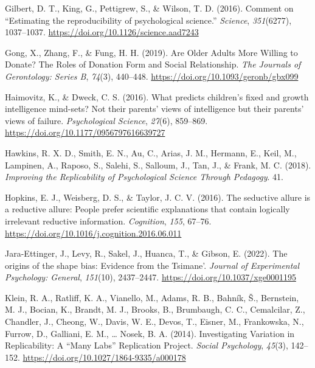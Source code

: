 \documentclass[
  english,
  a4paper,
]{article}
\newlength{\cslhangindent}
\newenvironment{CSLReferences}[2] %
{\begin{list}{}{%
			\setlength{\itemindent}{0pt}
			\setlength{\leftmargin}{0pt}
			\setlength{\parsep}{0pt}
			\ifodd #1
			\setlength{\leftmargin}{\cslhangindent}
			\setlength{\itemindent}{-1\cslhangindent}
			\fi
			\setlength{\itemsep}{#2\baselineskip}}}
	{\end{list}}
\begin{document}
\begin{CSLReferences}{1}{0}
Gilbert, D. T., King, G., Pettigrew, S., \& Wilson, T. D. (2016). Comment on {``{Estimating} the reproducibility of psychological science.''} \emph{Science}, \emph{351}(6277), 1037--1037. \url{https://doi.org/10.1126/science.aad7243}

Gong, X., Zhang, F., \& Fung, H. H. (2019). Are {Older Adults More Willing} to {Donate}? {The Roles} of {Donation Form} and {Social Relationship}. \emph{The Journals of Gerontology: Series B}, \emph{74}(3), 440--448. \url{https://doi.org/10.1093/geronb/gbx099}

Haimovitz, K., \& Dweck, C. S. (2016). What predicts children's fixed and growth intelligence mind-sets? {Not} their parents' views of intelligence but their parents' views of failure. \emph{Psychological Science}, \emph{27}(6), 859--869. \url{https://doi.org/10.1177/0956797616639727}

Hawkins, R. X. D., Smith, E. N., Au, C., Arias, J. M., Hermann, E., Keil, M., Lampinen, A., Raposo, S., Salehi, S., Salloum, J., Tan, J., \& Frank, M. C. (2018). \emph{Improving the {Replicability} of {Psychological Science Through Pedagogy}}. 41.

Hopkins, E. J., Weisberg, D. S., \& Taylor, J. C. V. (2016). The seductive allure is a reductive allure: {People} prefer scientific explanations that contain logically irrelevant reductive information. \emph{Cognition}, \emph{155}, 67--76. \url{https://doi.org/10.1016/j.cognition.2016.06.011}

Jara-Ettinger, J., Levy, R., Sakel, J., Huanca, T., \& Gibson, E. (2022). The origins of the shape bias: {Evidence} from the {Tsimane}'. \emph{Journal of Experimental Psychology: General}, \emph{151}(10), 2437--2447. \url{https://doi.org/10.1037/xge0001195}

Klein, R. A., Ratliff, K. A., Vianello, M., Adams, R. B., Bahník, Š., Bernstein, M. J., Bocian, K., Brandt, M. J., Brooks, B., Brumbaugh, C. C., Cemalcilar, Z., Chandler, J., Cheong, W., Davis, W. E., Devos, T., Eisner, M., Frankowska, N., Furrow, D., Galliani, E. M., \ldots{} Nosek, B. A. (2014). Investigating {Variation} in {Replicability}: {A} {``{Many Labs}''} {Replication Project}. \emph{Social Psychology}, \emph{45}(3), 142--152. \url{https://doi.org/10.1027/1864-9335/a000178}


\end{CSLReferences}
\end{document}
